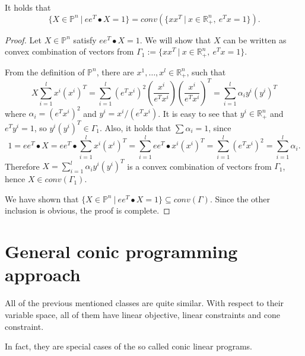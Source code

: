\documentclass[12pt]{book}
\theoremstyle{definition}
\begin{document}
\lema \label{convHullReprLema} It holds that $$\{X\in \mathbb{P}^n\ \vert \ ee^T\bullet X = 1\} = conv\left( \{ xx^T \ \vert \ x\in\mathbb{R}^n_+, \ e^T x = 1 \}\right). $$ \rm
\begin{proof}
Let $X\in\mathbb{P}^n$ satisfy $ee^T\bullet X = 1$. We will show that $X$ can be written as convex combination of vectors from $\Gamma_1:= \{ xx^T \ \vert \ x\in\mathbb{R}^n_+, \ e^T x = 1 \}.$ 

From the definition of $\mathbb{P}^n$, there are $x^1,\dots ,x^l\in \mathbb{R}^n_+$, such that  
\begin{equation*}
 X  \sum_{i=1}^l x^i(x^i)^T = \sum_{i=1}^l  (e^Tx^i)^2 \left(\frac{x^i}{e^Tx^i}\right)\left(\frac{x^i}{e^Tx^i}\right)^T =  \sum_{i=1}^l  \alpha_i y^i(y^i)^T
\end{equation*}
where $\alpha_i = (e^Tx^i)^2$ and $y^i =  x^i/(e^Tx^i)$. It is easy to see that $y^i\in \mathbb{R}^n_+$ and $e^Ty^i = 1$, so $y^i(y^i)^T\in \Gamma_1$.  
Also, it holds that $\sum \alpha_i = 1$, since 
\begin{equation*}
1 = ee^T\bullet X = ee^T\bullet \sum_{i=1}^l x^i(x^i)^T = \sum_{i=1}^lee^T\bullet x^i(x^i)^T = \sum_{i=1}^l (e^Tx^i)^2 = \sum_{i=1}^l \alpha_i.
\end{equation*}
Therefore $X = \sum_{i=1}^l  \alpha_i y^i(y^i)^T$ is a convex combination of vectors from $\Gamma_1$, hence $X\in conv(\Gamma_1)$.

We have shown that $\{X\in \mathbb{P}^n\ \vert \ ee^T\bullet X = 1\} \subseteq conv(\Gamma)$. Since the other inclusion is obvious, the proof is complete.

\end{proof}




\section{General conic programming approach}

All of the previous mentioned classes are quite similar. 
With respect to their variable space, all of them have linear objective, linear constraints and cone constraint.

In fact, they are special cases of the so called conic linear programs.
\end{document}
